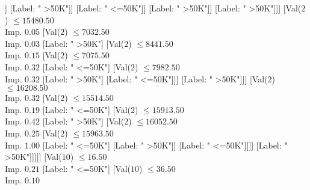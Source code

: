 \documentclass[margin=10pt]{standalone}
\begin{document}
\begin{forest}
								[Label: " <=50K"]
								[Val($10$) $ \leq 13.50$ \\ Imp. $0.07$
									[Val($2$) $ \leq 227.50$ \\ Imp. $0.06$
										[Label: " <=50K"]
										[Val($2$) $ \leq 2397.50$ \\ Imp. $0.02$
											[Val($2$) $ \leq 341.50$ \\ Imp. $0.06$
												[Label: " >50K"]
												[Val($2$) $ \leq 2372.50$ \\ Imp. $0.03$
													[Val($2$) $ \leq 1945.50$ \\ Imp. $0.08$
														[Val($2$) $ \leq 1787.50$ \\ Imp. $0.13$
															[Val($2$) $ \leq 1175.50$ \\ Imp. $0.10$
																[Val($2$) $ \leq 1126.50$ \\ Imp. $0.19$
																	[Label: " >50K"]
																	[Label: " <=50K"]]
																[Label: " >50K"]]
															[Label: " <=50K"]]
														[Label: " >50K"]]
													[Label: " >50K"]]]
											[Val($2$) $ \leq 15480.50$ \\ Imp. $0.05$
												[Val($2$) $ \leq 7032.50$ \\ Imp. $0.03$
													[Label: " >50K"]
													[Val($2$) $ \leq 8441.50$ \\ Imp. $0.15$
														[Val($2$) $ \leq 7075.50$ \\ Imp. $0.32$
															[Label: " <=50K"]
															[Val($2$) $ \leq 7982.50$ \\ Imp. $0.32$
																[Label: " >50K"]
																[Label: " <=50K"]]]
														[Label: " >50K"]]]
												[Val($2$) $ \leq 16208.50$ \\ Imp. $0.32$
													[Val($2$) $ \leq 15514.50$ \\ Imp. $0.19$
														[Label: " <=50K"]
														[Val($2$) $ \leq 15913.50$ \\ Imp. $0.42$
															[Label: " >50K"]
															[Val($2$) $ \leq 16052.50$ \\ Imp. $0.25$
																[Val($2$) $ \leq 15963.50$ \\ Imp. $1.00$
																	[Label: " <=50K"]
																	[Label: " >50K"]]
																[Label: " <=50K"]]]]
													[Label: " >50K"]]]]]
									[Val($10$) $ \leq 16.50$ \\ Imp. $0.21$
										[Label: " <=50K"]
										[Val($10$) $ \leq 36.50$ \\ Imp. $0.10$

\end{forest}
\end{document}
